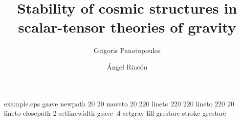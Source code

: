 %
%
%
%
%
\begin{filecontents*}{example.eps}
gsave
newpath
  20 20 moveto
  20 220 lineto
  220 220 lineto
  220 20 lineto
closepath
2 setlinewidth
gsave
  .4 setgray fill
grestore
stroke
grestore
\end{filecontents*}
%
\RequirePackage{fix-cm}
%
\documentclass[twocolumn,epjc3]{svjour3}  
%
\smartqed  %
%
\RequirePackage{graphicx}
%
%
%
%
%
\usepackage{amsmath}%
\usepackage{cite}%
\usepackage[colorinlistoftodos]{todonotes}%
\usepackage[colorlinks=true, allcolors=blue]{hyperref}%




\title{Stability of cosmic structures in scalar-tensor theories of gravity%
}


\author{Grigoris Panotopoulos 
        \and
        {\'A}ngel Rinc{\'o}n  %
}



